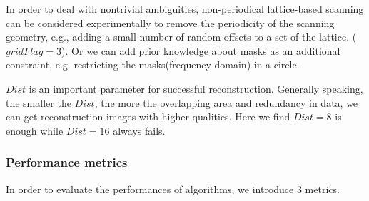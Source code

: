 \documentclass{article}
\numberwithin{equation}{section}
\begin{document}
\begin{center}
\end{center}
In order to deal with nontrivial
ambiguities, non-periodical lattice-based scanning can be considered experimentally to remove
the periodicity of the scanning geometry, e.g., adding a small number of random offsets to a
set of the lattice. ($gridFlag=3$). Or we can add prior knowledge about masks as an additional constraint, e.g. restricting the masks(frequency domain) in a circle.

$Dist$ is an important parameter for successful reconstruction. Generally speaking, the smaller the $Dist$, the more the overlapping area and redundancy in data, we can get reconstruction images with higher qualities. Here we find $Dist=8$ is enough while $Dist=16$ always fails.

\subsubsection{Performance metrics}
In order to evaluate the performances of algorithms, we introduce 3 metrics.
\end{document}
